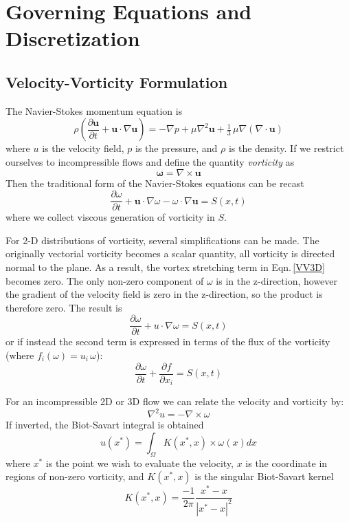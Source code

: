 \documentclass[]{aiaa-tc}%
\newcommand{\be}{\begin{equation}}
\newcommand{\ben}[1]{\begin{equation}\label{#1}}
\newcommand{\ee}{\end{equation}}
\begin{document}
\section{Governing Equations and Discretization}
\subsection{Velocity-Vorticity Formulation}
The Navier-Stokes momentum equation is
 \be \rho \left(\frac{\partial \mathbf{u}}{\partial t} + \mathbf{u} \cdot \nabla \mathbf{u} \right) = -\nabla p + \mu \nabla^2 \mathbf u + \tfrac13 \, \mu \nabla (\nabla\cdot\mathbf{u}) \ee
where $u$ is the velocity field, $p$ is the pressure, and $\rho$ is the density. If we restrict ourselves to incompressible flows and define the quantity \textit{vorticity} as
\be \mathbf{\omega} = \nabla \times \mathbf{u} \ee
Then the traditional form of the Navier-Stokes equations can be recast
\ben{VV3D} \frac{\partial \omega}{\partial t} +  \mathbf{u} \cdot \nabla \omega - \omega \cdot \nabla  \mathbf{u} = S(x,t)\ee
where we collect viscous generation of vorticity in $S$.

For 2-D distributions of vorticity, several simplifications can be made. The originally vectorial vorticity becomes a scalar quantity, all vorticity is directed normal to the plane. As a result, the vortex stretching term in  Eqn.\,\eqref{VV3D} becomes zero. The only non-zero component of $\omega$ is in the z-direction, however the gradient of the velocity field is zero in the z-direction, so the product is therefore zero. The result is
\ben{VV2D} \frac{\partial \omega}{\partial t} + u \cdot \nabla \omega = S(x,t)\ee
or if instead the second term is expressed in terms of the flux of the vorticity (where $f_i(\omega)=u_i\,\omega$):
\ben{VV2DB} \frac{\partial \omega}{\partial t} + \frac{\partial f}{\partial x_i}= S(x,t)\ee

 For an incompressible 2D or 3D flow we can relate the velocity and vorticity by:
\be \nabla^2 u = -\nabla \times \omega \ee
If inverted, the Biot-Savart integral is obtained
\ben{BS} u(x^*) = \int_\Omega K(x^*,x) \times \omega(x) dx \ee
where $x^*$ is the point we wish to evaluate the velocity, $x$ is the coordinate in regions of non-zero vorticity, and $K(x^*,x)$ is the singular Biot-Savart kernel \cite{BealeMajda}
\ben{BSkern} K(x^*,x) = \frac{-1}{2 \pi} \frac{x^*-x}{|x^*-x|^2} \ee
\end{document}
